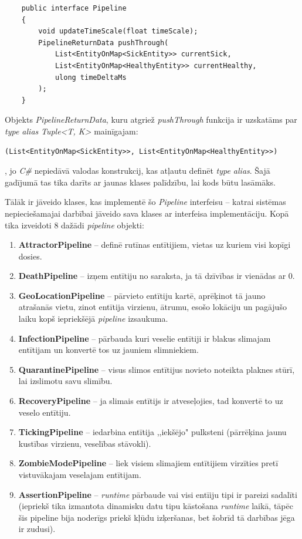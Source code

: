 {
\begin{verbatim}
    public interface Pipeline
    {
        void updateTimeScale(float timeScale);
        PipelineReturnData pushThrough(
            List<EntityOnMap<SickEntity>> currentSick,
            List<EntityOnMap<HealthyEntity>> currentHealthy,
            ulong timeDeltaMs
        );
    }
\end{verbatim}
}

Objekts \emph{PipelineReturnData}, kuru atgriež \emph{pushThrough} funkcija ir
uzskatāms par \emph{type alias} \emph{Tuple<T, K>} mainīgajam:

{
\begin{verbatim}
(List<EntityOnMap<SickEntity>>, List<EntityOnMap<HealthyEntity>>)
\end{verbatim}
}

, jo \emph{C\#} nepiedāvā valodas konstrukcij, kas atļautu definēt
\emph{type alias}. Šajā gadījumā tas tika darīts ar jaunas klases palīdzību, lai kods būtu lasāmāks.

Tālāk ir jāveido klases, kas implementē šo \emph{Pipeline} interfeisu -- katrai sistēmas
nepieciešamajai darbībai jāveido sava klases ar interfeisa implementāciju. Kopā
tika izveidoti 8 dažādi \emph{pipeline} objekti:

\begin{enumerate}
    \item \textbf{AttractorPipeline} -- definē rutīnas entītijiem, vietas uz kuriem visi kopīgi dosies.
    \item \textbf{DeathPipeline} -- izņem entītiju no saraksta, ja tā dzīvības ir vienādas ar \(0\).
    \item \textbf{GeoLocationPipeline} -- pārvieto entītiju kartē, aprēķinot tā jauno
        atrašanās vietu, zinot entītija virzienu, ātrumu, esošo lokāciju un pagājušo
        laiku kopš iepriekšējā \emph{pipeline} izsaukuma.
    \item \textbf{InfectionPipeline} -- pārbauda kuri veselie entītiji ir blakus slimajam
        entītijam un konvertē tos uz jauniem slimniekiem.
    \item \textbf{QuarantinePipeline} -- visus slimos entītijus novieto noteikta plaknes
        stūrī, lai izslimotu savu slimību.
    \item \textbf{RecoveryPipeline} -- ja slimais entītijs ir atveseļojies, tad konvertē to uz veselo entītiju.
    \item \textbf{TickingPipeline} -- iedarbina entītija ,,iekšējo" pulksteni (pārrēķina jaunu kustības virzienu, veselības stāvokli).
    \item \textbf{ZombieModePipeline} -- liek visiem slimajiem entītijiem virzīties pretī vistuvākajam veselajam entītijam.
    \item \textbf{AssertionPipeline} -- \emph{runtime} pārbaude vai visi entīiju tipi ir
        pareizi sadalīti (iepriekš tika izmantota dinamisku datu tipu
        kāstošana \emph{runtime} laikā, tāpēc šis pipeline bija
        noderīgs priekš kļūdu izķeršanas, bet šobrīd tā darbības jēga ir zudusi).
\end{enumerate}

